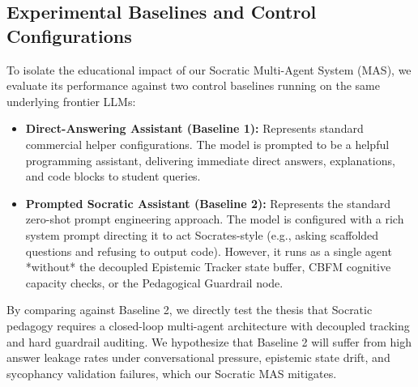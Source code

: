 \subsection{Experimental Baselines and Control Configurations}
To isolate the educational impact of our Socratic Multi-Agent System (MAS), we evaluate its performance against two control baselines running on the same underlying frontier LLMs:
\begin{itemize}
    \item \textbf{Direct-Answering Assistant (Baseline 1):} Represents standard commercial helper configurations. The model is prompted to be a helpful programming assistant, delivering immediate direct answers, explanations, and code blocks to student queries.
    \item \textbf{Prompted Socratic Assistant (Baseline 2):} Represents the standard zero-shot prompt engineering approach. The model is configured with a rich system prompt directing it to act Socrates-style (e.g., asking scaffolded questions and refusing to output code). However, it runs as a single agent *without* the decoupled Epistemic Tracker state buffer, CBFM cognitive capacity checks, or the Pedagogical Guardrail node.
\end{itemize}
By comparing against Baseline 2, we directly test the thesis that Socratic pedagogy requires a closed-loop multi-agent architecture with decoupled tracking and hard guardrail auditing. We hypothesize that Baseline 2 will suffer from high answer leakage rates under conversational pressure, epistemic state drift, and sycophancy validation failures, which our Socratic MAS mitigates.

